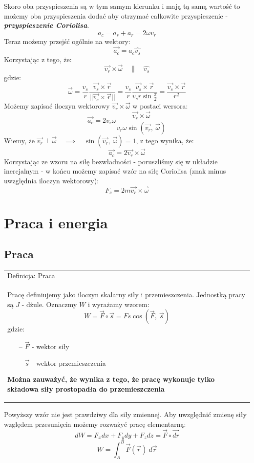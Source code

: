 \documentclass[a4paper]{article}
\newenvironment{definition}[2][Definicja]
    {
        \begin{center}
        \begin{tabular}{|p{1\textwidth}|}
        \hline
            #1: #2\\[2ex]
        \begin{em}
        \Large
    }
    { 
        \end{em}
        \\\hline
        \end{tabular} 
        \end{center}
    }
\begin{document}
    \noindent Skoro oba przyspieszenia są w tym samym kierunku i mają tą samą wartość to możemy
    oba przyspieszenia dodać aby otrzymać całkowite przyspieszenie - \textbf{\em{przyspieszenie Coriolisa}}.
    \[a_c = a_s + a_r = 2\omega v_r\]
    Teraz możemy przejść ogólnie na wektory:
    \[\vec{a_c} = a_c\hat{v_s}\]
    Korzystając z tego, że:
    \[\vec{v_r} \times \vec{\omega} \quad\parallel\quad \hat{v_s}\]
    gdzie:
    \[\vec{\omega} = \frac{v_s}{r}\frac{\vec{v_s} \times \vec{r}}{||\vec{v_s} \times \vec{r}||} = 
    \frac{v_s}{r}\frac{\vec{v_s} \times \vec{r}}{v_sr\sin{\frac{\pi}{2}}} = \frac{\vec{v_s} \times \vec{r}}{r^2}\]
    Możemy zapisać iloczyn wektorowy $\vec{v_r} \times \vec{\omega}$ w postaci wersora:
    \[\vec{a_c} = 2v_r\omega\frac{\vec{v_r} \times \vec{\omega}}{v_r\omega\sin\left(\vec{v_r},\ \vec{\omega}\right)}\]
    Wiemy, że $\vec{v_r} \perp \vec{\omega} \quad\implies\quad \sin\left(\vec{v_r},\ \vec{\omega}\right) = 1$,
    z tego wynika, że:
    \[\vec{a_c} = 2\vec{v_r} \times \vec{\omega}\]
    Korzystając ze wzoru na siłę bezwładności - poruszliśmy się w układzie inercjalnym - w końcu możemy zapisać wzór na siłę Coriolisa (znak minus uwzględnia 
    iloczyn wektorowy):
    \[F_c = 2m\vec{v_r} \times \vec{\omega}\]
    \pagebreak
    
    \section{\huge Praca i energia}
    \subsection{\LARGE Praca}
    \begin{definition}{Praca}
        Pracę definiujemy jako iloczyn skalarny siły i przemieszczenia. Jednostką pracy są
        $J$ - dżule. Oznaczmy $W$ i wyrażamy wzorem:
        \[W = \vec{F} \circ \vec{s} = Fs\cos\left(\vec{F},\ \vec{s} \right)\]
        gdzie:
        \begin{itemize}
            \item [--] $\vec{F}$ - wektor siły
            \item [--] $\vec{s}$ - wektor przemieszczenia
        \end{itemize}
        \textbf{Można zauważyć, że wynika z tego, że pracę wykonuje tylko składowa siły
        prostopadła do przemieszczenia}
    \end{definition}
    Powyższy wzór nie jest prawdziwy dla siły zmiennej. Aby uwzględnić zmienę siły względem
    przesunięcia możemy rozważyć pracę elementarną:
    \[dW = F_xdx + F_ydy + F_zdz = \vec{F} \circ \vec{dr}\]
    \[W = \int_{A}^{B} \vec{F}(\vec{r})\ d\vec{r}\]
\end{document}
